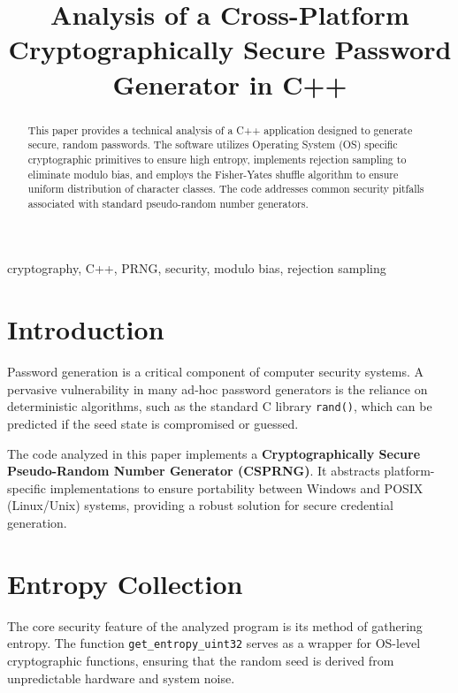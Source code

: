\documentclass[conference]{IEEEtran}
\begin{document}
\title{Analysis of a Cross-Platform Cryptographically Secure Password Generator in C++}

\author{
}

\maketitle

\begin{abstract}
This paper provides a technical analysis of a C++ application designed to generate secure, random passwords. The software utilizes Operating System (OS) specific cryptographic primitives to ensure high entropy, implements rejection sampling to eliminate modulo bias, and employs the Fisher-Yates shuffle algorithm to ensure uniform distribution of character classes. The code addresses common security pitfalls associated with standard pseudo-random number generators.
\end{abstract}

\begin{IEEEkeywords}
cryptography, C++, PRNG, security, modulo bias, rejection sampling
\end{IEEEkeywords}

\section{Introduction}
Password generation is a critical component of computer security systems. A pervasive vulnerability in many ad-hoc password generators is the reliance on deterministic algorithms, such as the standard C library \texttt{rand()}, which can be predicted if the seed state is compromised or guessed.

The code analyzed in this paper implements a \textbf{Cryptographically Secure Pseudo-Random Number Generator (CSPRNG)}. It abstracts platform-specific implementations to ensure portability between Windows and POSIX (Linux/Unix) systems, providing a robust solution for secure credential generation.

\section{Entropy Collection}
The core security feature of the analyzed program is its method of gathering entropy. The function \texttt{get\_entropy\_uint32} serves as a wrapper for OS-level cryptographic functions, ensuring that the random seed is derived from unpredictable hardware and system noise.
\end{document}

